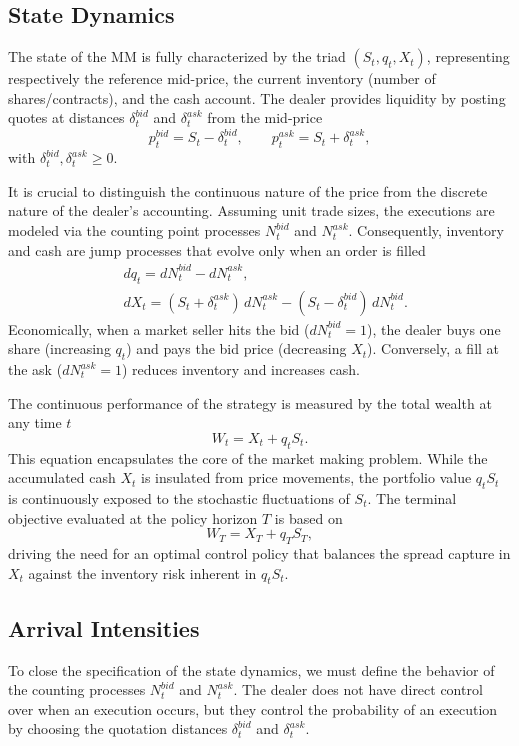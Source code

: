 \subsection{State Dynamics}
The state of the MM is fully characterized by the triad $(S_t, q_t, X_t)$, representing respectively the reference mid-price, the current inventory (number of shares/contracts), and the cash account. The dealer provides liquidity by posting quotes at distances $\delta_t^{bid}$ and $\delta_t^{ask}$ from the mid-price
\[
p_t^{bid}=S_t-\delta_t^{bid}, \qquad p_t^{ask}=S_t+\delta_t^{ask},
\]
with $\delta_t^{bid},\delta_t^{ask}\ge 0$.

It is crucial to distinguish the continuous nature of the price from the discrete nature of the dealer's accounting. Assuming unit trade sizes, the executions are modeled via the counting point processes $N_t^{bid}$ and $N_t^{ask}$. Consequently, inventory and cash are jump processes that evolve only when an order is filled
\begin{align*}
    &dq_t=dN_t^{bid}-dN_t^{ask},\\
    &dX_t=(S_t+\delta_t^{ask})\,dN_t^{ask}-(S_t-\delta_t^{bid})\,dN_t^{bid}.
\end{align*}
Economically, when a market seller hits the bid ($dN_t^{bid}=1$), the dealer buys one share (increasing $q_t$) and pays the bid price (decreasing $X_t$). Conversely, a fill at the ask ($dN_t^{ask}=1$) reduces inventory and increases cash.

The continuous performance of the strategy is measured by the total wealth at any time $t$
\[
W_t=X_t+q_tS_t.
\]
This equation encapsulates the core of the market making problem. While the accumulated cash $X_t$ is insulated from price movements, the portfolio value $q_tS_t$ is continuously exposed to the stochastic fluctuations of $S_t$. The terminal objective evaluated at the policy horizon $T$ is based on 
\[
W_T=X_T+q_TS_T,
\]
driving the need for an optimal control policy that balances the spread capture in $X_t$ against the inventory risk inherent in $q_tS_t$.

\subsection{Arrival Intensities}
To close the specification of the state dynamics, we must define the behavior of the counting processes $N_t^{bid}$ and $N_t^{ask}$. The dealer does not have direct control over when an execution occurs, but they control the probability of an execution by choosing the quotation distances $\delta_t^{bid}$ and $\delta_t^{ask}$.

